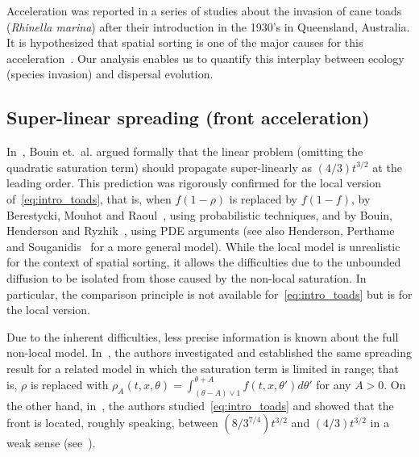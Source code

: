 \documentclass[AHL,Unicode,longabstracts]{cedram}
\newcommand{\1}{\mathds{1}}
\begin{document}
Acceleration was reported in a series of studies about the invasion of cane toads ({\em Rhinella marina}) \cite{phillips2006invasion, urban_toad_2008} after their introduction in the 1930's in Queensland, Australia. It is hypothesized that spatial sorting is one of the major causes for this acceleration~\cite{shine}. Our analysis enables us to quantify this interplay between ecology (species invasion) and dispersal evolution.



\subsection*{Super-linear spreading (front acceleration)}


In~\cite{BCMetal}, Bouin et.~al. argued formally that the linear problem (omitting the quadratic saturation term) should propagate super-linearly as $(4/3) t^{3/2}$ at the leading order. This prediction was rigorously confirmed for the local version of~\eqref{eq:intro_toads}, that is, when $f(1-\rho)$ is replaced by $f(1-f)$, by Berestycki, Mouhot and Raoul~\cite{BerestyckiMouhotRaoul}, using probabilistic techniques, and by Bouin, Henderson and Ryzhik~\cite{BHR_acceleration}, using PDE arguments (see also Henderson, Perthame and Souganidis~\cite{HendersonPerthameSouganidis} for a more general model). While the local model is unrealistic for the context of spatial sorting, it allows the difficulties due to the unbounded diffusion to be isolated from those caused by the non-local saturation. In particular, the comparison principle is not available for~\eqref{eq:intro_toads} but is for the local version.

Due to the inherent difficulties, less precise information is known about the full non-local model. In~\cite{BerestyckiMouhotRaoul}, the authors investigated and established the same spreading result for a related model in which the saturation term is limited in range; that is, $\rho$ is replaced with $\rho_A(t,x,\theta) = \int_{(\theta-A)\vee 1}^{\theta+A} f(t,x,\theta')d\theta'$ for any $A>0$. On the other hand, in~\cite{BHR_acceleration}, the authors studied~\eqref{eq:intro_toads} and showed that the front is located, roughly speaking, between $(8/3^{7/4}) t^{3/2}$ and $(4/3) t^{3/2}$ in a weak sense (see~\cite[Theorem~1.2]{BHR_acceleration}).
\end{document}
